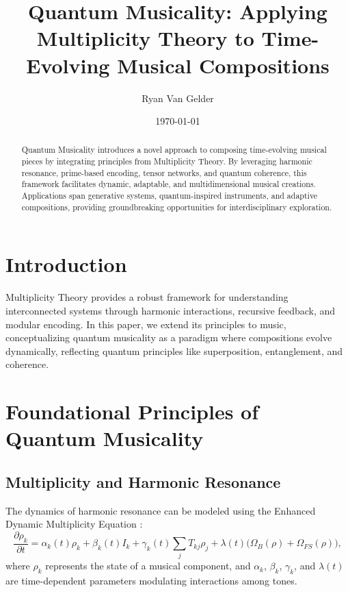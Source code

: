 \documentclass{article}
\theoremstyle{plain}
\begin{document}
\title{Quantum Musicality: Applying Multiplicity Theory to Time-Evolving Musical Compositions}

\author{Ryan Van Gelder}
\date{\today}
\maketitle

\begin{abstract}
Quantum Musicality introduces a novel approach to composing time-evolving musical pieces by integrating principles from Multiplicity Theory. By leveraging harmonic resonance, prime-based encoding, tensor networks, and quantum coherence, this framework facilitates dynamic, adaptable, and multidimensional musical creations. Applications span generative systems, quantum-inspired instruments, and adaptive compositions, providing groundbreaking opportunities for interdisciplinary exploration.
\end{abstract}

\section{Introduction}
Multiplicity Theory provides a robust framework for understanding interconnected systems through harmonic interactions, recursive feedback, and modular encoding. In this paper, we extend its principles to music, conceptualizing quantum musicality as a paradigm where compositions evolve dynamically, reflecting quantum principles like superposition, entanglement, and coherence.

\section{Foundational Principles of Quantum Musicality}

\subsection{Multiplicity and Harmonic Resonance}
The dynamics of harmonic resonance can be modeled using the Enhanced Dynamic Multiplicity Equation \cite{galioto2024dynamic}:
\begin{equation}
\frac{\partial \rho_k}{\partial t} = \alpha_k(t) \rho_k + \beta_k(t) I_k + \gamma_k(t) \sum_j T_{kj} \rho_j + \lambda(t) \big(\Omega_B(\rho) + \Omega_{FS}(\rho)\big),
\end{equation}
where $\rho_k$ represents the state of a musical component, and $\alpha_k$, $\beta_k$, $\gamma_k$, and $\lambda(t)$ are time-dependent parameters modulating interactions among tones.
\end{document}
